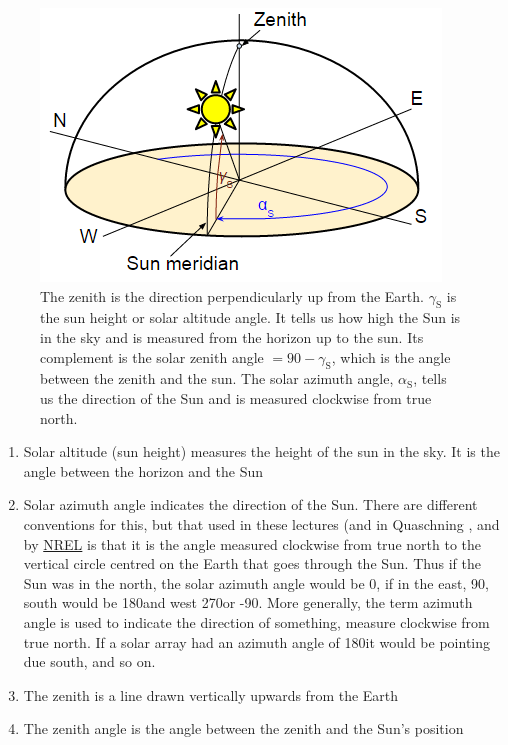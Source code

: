 \documentclass[class=scrartcl, crop=false,parskip=half]{standalone}
\begin{document}
\begin{solution}
    \begin{figure}[ht]
    \centering
    \includegraphics{../figures/SolarAngles.png}
    \caption{The zenith is the direction perpendicularly up from the Earth. $\gamma_\text{S}$ is the sun height or solar altitude angle. It tells us how high the Sun is in the sky and is measured from the horizon up to the sun. Its complement is the solar zenith angle $=90-\gamma_\text{S}$, which is the angle between the zenith and the sun.  The solar azimuth angle, $\alpha_\text{S}$, tells us the direction of the Sun and is measured clockwise from true north. }
    \end{figure}
    \begin{enumerate}[label=\alph*)]
        \item Solar altitude (sun height) measures the height of the sun in the sky. It is the angle between the horizon and the Sun
        \item Solar azimuth angle indicates the direction of the Sun. There are different conventions for this, but that used in these lectures (and in Quaschning \cite{Quaschning2005}, and by \href{http://www.nrel.gov/solar/}{NREL} is that it is the angle measured clockwise from true north to the vertical circle centred on the Earth that goes through the Sun. Thus if the Sun was in the north, the solar azimuth angle would be 0\degree, if in the east, 90\degree, south would be 180\degree and west 270\degree or -90\degree . More generally, the term azimuth angle is used to indicate the direction of something, measure clockwise from true north. If a solar array had an azimuth angle of 180\degree it would be pointing due south, and so on.
        \item The zenith is a line drawn vertically upwards from the Earth
        \item The zenith angle is the angle between the zenith and the Sun's position

\end{enumerate}
\end{solution}
\end{document}
